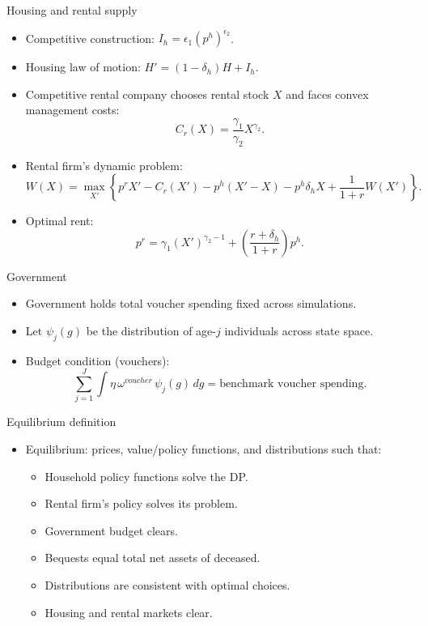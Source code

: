 \documentclass[10pt,aspectratio=169]{beamer}
\begin{document}
\begin{frame}{Housing and rental supply}
\begin{itemize}
\item Competitive construction: $I_h=\epsilon_1 (p^h)^{\epsilon_2}$.
\item Housing law of motion: $H'=(1-\delta_h)H + I_h$.
\item Competitive rental company chooses rental stock $X$ and faces convex management costs:
\[
C_r(X)=\frac{\gamma_1}{\gamma_2}X^{\gamma_2}.
\]
\item Rental firm's dynamic problem:
\[
W(X)=\max_{X'}\left\{p^rX' - C_r(X') - p^h(X'-X) - p^h\delta_h X + \frac{1}{1+r}W(X')\right\}.
\]
\item Optimal rent:
\[
p^r=\gamma_1 (X')^{\gamma_2-1}+\left(\frac{r+\delta_h}{1+r}\right)p^h.
\]
\end{itemize}
\end{frame}

\begin{frame}{Government}
\begin{itemize}
\item Government holds total voucher spending fixed across simulations.
\item Let $\psi_j(g)$ be the distribution of age-$j$ individuals across state space.
\item Budget condition (vouchers):
\[
\sum_{j=1}^{J}\int \eta\,\omega^{voucher}\,\psi_j(g)\,dg = \text{benchmark voucher spending}.
\]
\end{itemize}
\end{frame}

\begin{frame}{Equilibrium definition}
\begin{itemize}
\item Equilibrium: prices, value/policy functions, and distributions such that:
\begin{itemize}
\item Household policy functions solve the DP.
\item Rental firm's policy solves its problem.
\item Government budget clears.
\item Bequests equal total net assets of deceased.
\item Distributions are consistent with optimal choices.
\item Housing and rental markets clear.
\end{itemize}
\end{itemize}
\end{frame}
\end{document}
